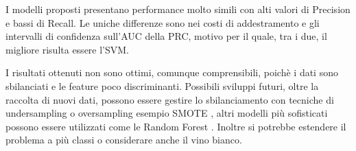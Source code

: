 \noindent
I modelli proposti presentano performance molto simili con alti valori di Precision e bassi di Recall. Le uniche differenze sono nei costi di addestramento e gli intervalli di confidenza sull'AUC della PRC, motivo per il quale, tra i due, il migliore risulta essere l'SVM.

\noindent
I risultati ottenuti non sono ottimi, comunque comprensibili, poichè i dati sono sbilanciati e le feature poco discriminanti.
Possibili sviluppi futuri, oltre la raccolta di nuovi dati, possono essere gestire lo sbilanciamento con tecniche di undersampling o oversampling esempio SMOTE \cite{chawla2002smote}, altri modelli più sofisticati possono essere utilizzati come le Random Forest \cite{biau2016random}.
Inoltre si potrebbe estendere il problema a più classi o considerare anche il vino bianco.
